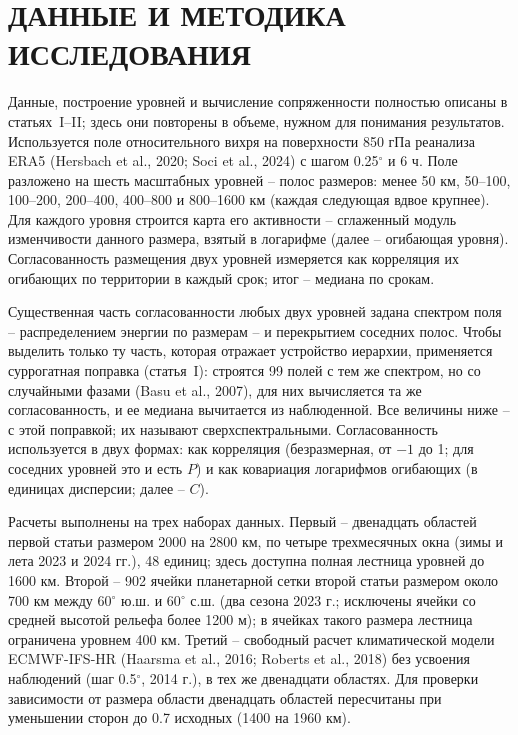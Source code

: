 \documentclass[12pt,a4paper]{article}
\begin{document}
\section{ДАННЫЕ И МЕТОДИКА ИССЛЕДОВАНИЯ}

Данные, построение уровней и вычисление сопряженности полностью описаны в статьях~I--II; здесь они повторены в объеме, нужном для понимания результатов. Используется поле относительного вихря на поверхности 850 гПа реанализа ERA5 (Hersbach et al., 2020; Soci et al., 2024) с шагом 0.25$^\circ$ и 6 ч. Поле разложено на шесть масштабных уровней -- полос размеров: менее 50 км, 50--100, 100--200, 200--400, 400--800 и 800--1600 км (каждая следующая вдвое крупнее). Для каждого уровня строится карта его активности -- сглаженный модуль изменчивости данного размера, взятый в логарифме (далее -- огибающая уровня). Согласованность размещения двух уровней измеряется как корреляция их огибающих по территории в каждый срок; итог -- медиана по срокам.

Существенная часть согласованности любых двух уровней задана спектром поля -- распределением энергии по размерам -- и перекрытием соседних полос. Чтобы выделить только ту часть, которая отражает устройство иерархии, применяется суррогатная поправка (статья~I): строятся 99 полей с тем же спектром, но со случайными фазами (Basu et al., 2007), для них вычисляется та же согласованность, и ее медиана вычитается из наблюденной. Все величины ниже -- с этой поправкой; их называют сверхспектральными. Согласованность используется в двух формах: как корреляция (безразмерная, от $-1$ до 1; для соседних уровней это и есть $P$) и как ковариация логарифмов огибающих (в единицах дисперсии; далее -- $C$).

Расчеты выполнены на трех наборах данных. Первый -- двенадцать областей первой статьи размером 2000 на 2800 км, по четыре трехмесячных окна (зимы и лета 2023 и 2024 гг.), 48 единиц; здесь доступна полная лестница уровней до 1600 км. Второй -- 902 ячейки планетарной сетки второй статьи размером около 700 км между 60$^\circ$ ю.ш. и 60$^\circ$ с.ш. (два сезона 2023 г.; исключены ячейки со средней высотой рельефа более 1200 м); в ячейках такого размера лестница ограничена уровнем 400 км. Третий -- свободный расчет климатической модели ECMWF-IFS-HR (Haarsma et al., 2016; Roberts et al., 2018) без усвоения наблюдений (шаг 0.5$^\circ$, 2014 г.), в тех же двенадцати областях. Для проверки зависимости от размера области двенадцать областей пересчитаны при уменьшении сторон до 0.7 исходных (1400 на 1960 км).
\end{document}
